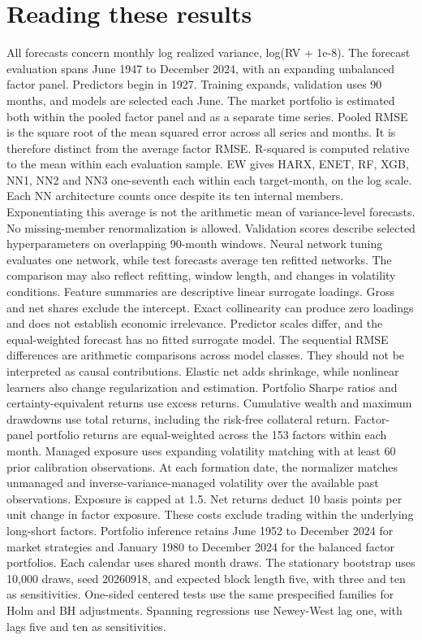 \section*{Reading these results}
All forecasts concern monthly log realized variance, log(RV + 1e-8). The forecast evaluation spans June 1947 to December 2024, with an expanding unbalanced factor panel. Predictors begin in 1927. Training expands, validation uses 90 months, and models are selected each June.
The market portfolio is estimated both within the pooled factor panel and as a separate time series.
Pooled RMSE is the square root of the mean squared error across all series and months. It is therefore distinct from the average factor RMSE. R-squared is computed relative to the mean within each evaluation sample.
EW gives HARX, ENET, RF, XGB, NN1, NN2 and NN3 one-seventh each within each target-month, on the log scale. Each NN architecture counts once despite its ten internal members. Exponentiating this average is not the arithmetic mean of variance-level forecasts. No missing-member renormalization is allowed.
Validation scores describe selected hyperparameters on overlapping 90-month windows. Neural network tuning evaluates one network, while test forecasts average ten refitted networks. The comparison may also reflect refitting, window length, and changes in volatility conditions.
Feature summaries are descriptive linear surrogate loadings. Gross and net shares exclude the intercept. Exact collinearity can produce zero loadings and does not establish economic irrelevance. Predictor scales differ, and the equal-weighted forecast has no fitted surrogate model.
The sequential RMSE differences are arithmetic comparisons across model classes. They should not be interpreted as causal contributions. Elastic net adds shrinkage, while nonlinear learners also change regularization and estimation.
Portfolio Sharpe ratios and certainty-equivalent returns use excess returns. Cumulative wealth and maximum drawdowns use total returns, including the risk-free collateral return. Factor-panel portfolio returns are equal-weighted across the 153 factors within each month.
Managed exposure uses expanding volatility matching with at least 60 prior calibration observations. At each formation date, the normalizer matches unmanaged and inverse-variance-managed volatility over the available past observations. Exposure is capped at 1.5. Net returns deduct 10 basis points per unit change in factor exposure. These costs exclude trading within the underlying long-short factors.
Portfolio inference retains June 1952 to December 2024 for market strategies and January 1980 to December 2024 for the balanced factor portfolios. Each calendar uses shared month draws. The stationary bootstrap uses 10,000 draws, seed 20260918, and expected block length five, with three and ten as sensitivities. One-sided centered tests use the same prespecified families for Holm and BH adjustments. Spanning regressions use Newey-West lag one, with lags five and ten as sensitivities.

